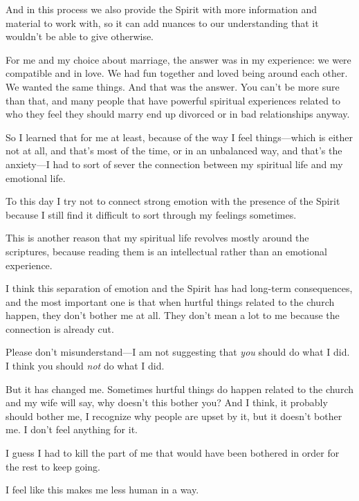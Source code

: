 \begin{compactitem}
\begin{compactitem}
\begin{compactitem}
							\item And in this process we also provide the Spirit with more information and material to work with, so it can add nuances to our understanding that it wouldn't be able to give otherwise.
							\item For me and my choice about marriage, the answer was in my experience: we were compatible and in love. We had fun together and loved being around each other. We wanted the same things. And that was the answer. You can't be more sure than that, and many people that have powerful spiritual experiences related to who they feel they should marry end up divorced or in bad relationships anyway.
						\end{compactitem}
					\item So I learned that for me at least, because of the way I feel things---which is either not at all, and that's most of the time, or in an unbalanced way, and that's the anxiety---I had to sort of sever the connection between my spiritual life and my emotional life. 
					\item To this day I try not to connect strong emotion with the presence of the Spirit because I still find it difficult to sort through my feelings sometimes.
					\item This is another reason that my spiritual life revolves mostly around the scriptures, because reading them is an intellectual rather than an emotional experience.
					\item I think this separation of emotion and the Spirit has had long-term consequences, and the most important one is that when hurtful things related to the church happen, they don't bother me at all. They don't mean a lot to me because the connection is already cut.
						\begin{compactitem}
							\item Please don't misunderstand---I am not suggesting that \textit{you} should do what I did. I think you should \textit{not} do what I did.
							\item But it has changed me. Sometimes hurtful things do happen related to the church and my wife will say, why doesn't this bother you? And I think, it probably should bother me, I recognize why people are upset by it, but it doesn't bother me. I don't feel anything for it.
							\item I guess I had to kill the part of me that would have been bothered in order for the rest to keep going.
							\item I feel like this makes me less human in a way.
						\end{compactitem}
				\end{compactitem}
				

\end{compactitem}
